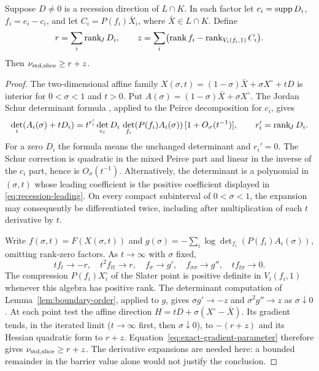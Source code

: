 \begin{lemma}\label{lem:recession}
Suppose $D\ne0$ is a recession direction of $L\cap K$. In each factor
let $c_i=\operatorname{supp} D_i$, $f_i=e_i-c_i$, and let
$C_i=P(f_i)\bar X_i$, where $\bar X\in L\cap K$. Define
\[
 r=\sum_i\operatorname{rank}_{\!J} D_i,\qquad
 z=\sum_i\bigl(\operatorname{rank} f_i-\operatorname{rank}_{V_i(f_i,1)} C_i\bigr).
\]
Then $\nu_{\mathrm{std},\mathrm{slice}}\geq r+z$.
\end{lemma}
\begin{proof}
The two-dimensional affine family
$X(\sigma,t)=(1-\sigma)\bar X+\sigma X^\circ+tD$ is interior for
$0<\sigma<1$ and $t>0$. Put $A(\sigma)=(1-\sigma)\bar X+\sigma X^\circ$.
The Jordan Schur determinant formula \citep{GS2010}, applied to the
Peirce decomposition for $c_i$, gives
\begin{equation}\label{eq:recession-leading}
 \det_i(A_i(\sigma)+tD_i)
 =t^{r_i'}\det_{c_i}D_i\,
   \det_{f_i}(P(f_i)A_i(\sigma))\,[1+O_\sigma(t^{-1})],
 \qquad r_i'=\operatorname{rank}_{\!J} D_i.
\end{equation}
For a zero $D_i$ the formula means the unchanged determinant and
$r_i'=0$. The Schur correction is quadratic in the mixed Peirce part
and linear in the inverse of the $c_i$ part, hence is $O_\sigma(t^{-1})$.
Alternatively, the determinant is a polynomial in $(\sigma,t)$ whose
leading coefficient is the positive coefficient displayed in
\eqref{eq:recession-leading}. On every compact subinterval of
$0<\sigma<1$, the expansion may consequently be differentiated twice,
including after multiplication of each $t$ derivative by $t$.

Write $f(\sigma,t)=F(X(\sigma,t))$ and
$g(\sigma)=-\sum_i\log\det_{f_i}(P(f_i)A_i(\sigma))$, omitting rank-zero
factors. As $t\to\infty$ with $\sigma$ fixed,
\[
 tf_t\to-r,\quad t^2f_{tt}\to r,\quad
 f_\sigma\to g',\quad f_{\sigma\sigma}\to g'',\quad
 tf_{t\sigma}\to0.
\]
The compression $P(f_i)X_i^\circ$ of the Slater point is positive
definite in $V_i(f_i,1)$ whenever this algebra has positive rank. The
determinant computation of Lemma~\ref{lem:boundary-order}, applied to
$g$, gives
$\sigma g'\to-z$ and $\sigma^2g''\to z$ as $\sigma\downarrow0$.
At each point test the affine direction $H=tD+\sigma(X^\circ-\bar X)$.
Its gradient tends, in the iterated limit ($t\to\infty$ first, then
$\sigma\downarrow0$), to $-(r+z)$ and its
Hessian quadratic form to $r+z$. Equation~\eqref{eq:exact-gradient-parameter}
therefore gives $\nu_{\mathrm{std},\mathrm{slice}}\geq r+z$. The derivative expansions are needed
here: a bounded remainder in the barrier value alone would not justify
the conclusion.
\end{proof}

